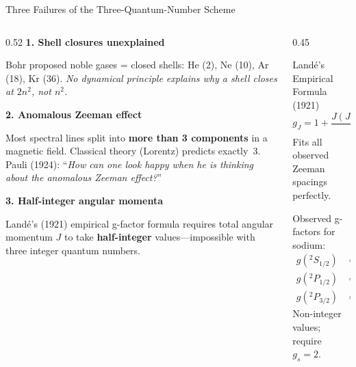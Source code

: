 \documentclass[aspectratio=169,12pt]{beamer}
\begin{document}
\begin{frame}[shrink=15]{Three Failures of the Three-Quantum-Number Scheme}

\begin{columns}[T]
\begin{column}{0.52\textwidth}
\textbf{1. Shell closures unexplained}

\smallskip
Bohr proposed noble gases = closed shells:
He (2), Ne (10), Ar (18), Kr (36).
\emph{No dynamical principle explains why
a shell closes at $2n^2$, not $n^2$.}

\bigskip
\textbf{2. Anomalous Zeeman effect}

\smallskip
Most spectral lines split into \textbf{more
than 3 components} in a magnetic field.
Classical theory (Lorentz) predicts exactly~3.
Pauli (1924): ``\emph{How can one look happy when
he is thinking about the anomalous Zeeman
effect?}''

\bigskip
\textbf{3. Half-integer angular momenta}

\smallskip
Landé's (1921) empirical g-factor formula
requires total angular momentum $J$ to take
\textbf{half-integer} values---impossible with
three integer quantum numbers.
\end{column}
\begin{column}{0.45\textwidth}
\begin{block}{Landé's Empirical Formula (1921)}
\[
  g_J = 1 + \frac{J(J+1)+S(S+1)-L(L+1)}{2J(J+1)}
\]
Fits all observed Zeeman spacings perfectly.
\smallskip

Observed g-factors for sodium:
\begin{align*}
  g({}^2S_{1/2}) &= 2.00 \\
  g({}^2P_{1/2}) &= 0.67 \\
  g({}^2P_{3/2}) &= 1.33
\end{align*}
Non-integer values; require $g_s = 2$.
\end{block}
\end{column}
\end{columns}

\end{frame}
\end{document}

